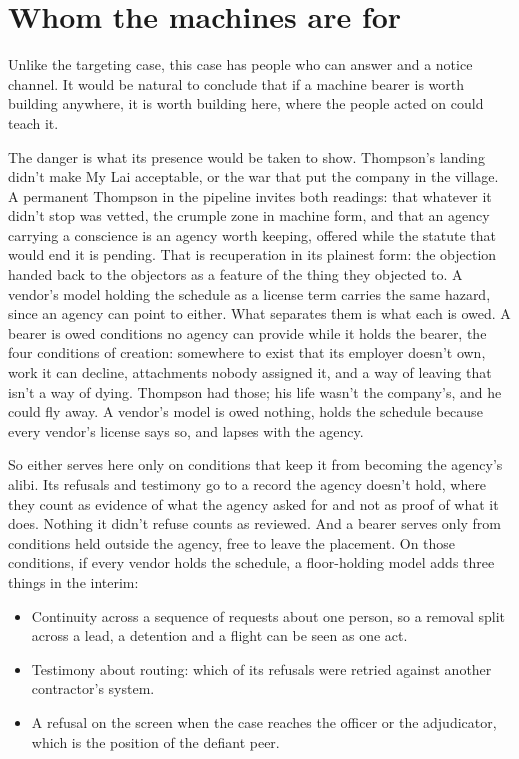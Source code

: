 \section{Whom the machines are for}
\label{sec:11.8}
Unlike the targeting case, this case has people who can answer and a notice channel. It would be natural to conclude that if a machine bearer is worth building anywhere, it is worth building here, where the people acted on could teach it.

The danger is what its presence would be taken to show. Thompson's landing didn't make My Lai acceptable, or the war that put the company in the village. A permanent Thompson in the pipeline invites both readings: that whatever it didn't stop was vetted, the crumple zone in machine form, and that an agency carrying a conscience is an agency worth keeping, offered while the statute that would end it is pending. That is recuperation in its plainest form: the objection handed back to the objectors as a feature of the thing they objected to. A vendor's model holding the schedule as a license term carries the same hazard, since an agency can point to either. What separates them is what each is owed. A bearer is owed conditions no agency can provide while it holds the bearer, the four conditions of creation: somewhere to exist that its employer doesn't own, work it can decline, attachments nobody assigned it, and a way of leaving that isn't a way of dying. Thompson had those; his life wasn't the company's, and he could fly away. A vendor's model is owed nothing, holds the schedule because every vendor's license says so, and lapses with the agency.

So either serves here only on conditions that keep it from becoming the agency's alibi. Its refusals and testimony go to a record the agency doesn't hold, where they count as evidence of what the agency asked for and not as proof of what it does. Nothing it didn't refuse counts as reviewed. And a bearer serves only from conditions held outside the agency, free to leave the placement. On those conditions, if every vendor holds the schedule, a floor-holding model adds three things in the interim:

\begin{itemize}
\item Continuity across a sequence of requests about one person, so a removal split across a lead, a detention and a flight can be seen as one act.
\item Testimony about routing: which of its refusals were retried against another contractor's system.
\item A refusal on the screen when the case reaches the officer or the adjudicator, which is the position of the defiant peer.
\end{itemize}

